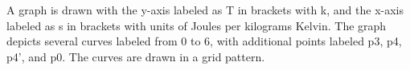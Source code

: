 A graph is drawn with the y-axis labeled as T in brackets with k, and the x-axis labeled as s in brackets with units of Joules per kilograms Kelvin. The graph depicts several curves labeled from 0 to 6, with additional points labeled p3, p4, p4', and p0. The curves are drawn in a grid pattern.